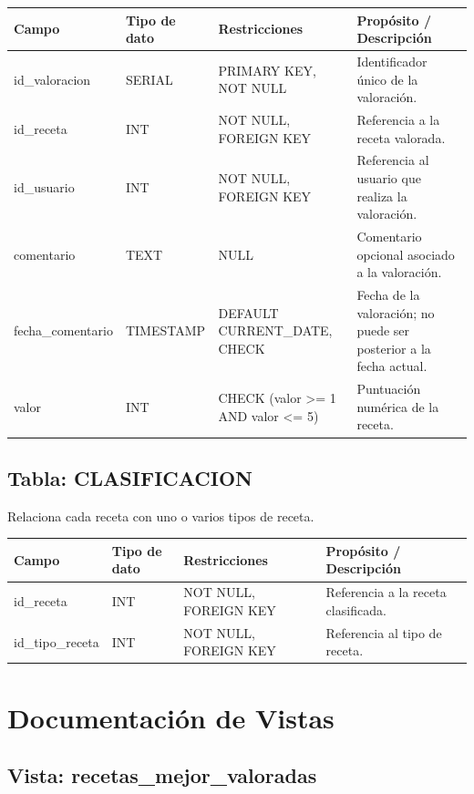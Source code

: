 \documentclass[12pt,a4paper]{article}
\begin{document}
\begin{longtable}{|p{3.5cm}|p{2.5cm}|p{3.5cm}|p{5cm}|}
\hline
\textbf{Campo} & \textbf{Tipo de dato} & \textbf{Restricciones} & \textbf{Propósito / Descripción} \\
\hline
id\_valoracion & SERIAL & PRIMARY KEY, NOT NULL & Identificador único de la valoración. \\
\hline
id\_receta & INT & NOT NULL, FOREIGN KEY & Referencia a la receta valorada. \\
\hline
id\_usuario & INT & NOT NULL, FOREIGN KEY & Referencia al usuario que realiza la valoración. \\
\hline
comentario & TEXT & NULL & Comentario opcional asociado a la valoración. \\
\hline
fecha\_comentario & TIMESTAMP & DEFAULT CURRENT\_DATE, CHECK & Fecha de la valoración; no puede ser posterior a la fecha actual. \\
\hline
valor & INT & CHECK (valor >= 1 AND valor <= 5) & Puntuación numérica de la receta. \\
\hline
\end{longtable}

\subsection{Tabla: CLASIFICACION}

Relaciona cada receta con uno o varios tipos de receta.

\begin{longtable}{|p{3.5cm}|p{2.5cm}|p{3.5cm}|p{5cm}|}
\hline
\textbf{Campo} & \textbf{Tipo de dato} & \textbf{Restricciones} & \textbf{Propósito / Descripción} \\
\hline
id\_receta & INT & NOT NULL, FOREIGN KEY & Referencia a la receta clasificada. \\
\hline
id\_tipo\_receta & INT & NOT NULL, FOREIGN KEY & Referencia al tipo de receta. \\
\hline
\end{longtable}

\section{Documentación de Vistas}

\subsection{Vista: recetas\_mejor\_valoradas}
\end{document}
